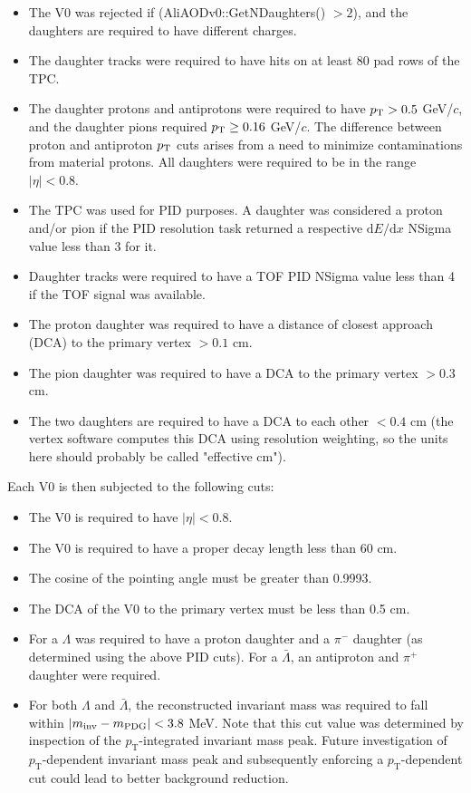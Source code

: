 \begin{itemize}
\item The V0 was rejected if (AliAODv0::GetNDaughters() $> 2$), and the daughters are required to have different charges.
\item The daughter tracks were required to have hits on at least 80 pad rows of the TPC.
\item The daughter protons and antiprotons were required to have $p_{\rm T} > 0.5$ GeV/$c$, and the daughter pions required $p_{\rm T} \geq 0.16$ GeV/$c$. 
The difference between proton and antiproton $p_{\rm T}$ cuts arises from a need to minimize contaminations from material protons. 
All daughters were required to be in the range $|\eta| < 0.8$.
\item The TPC was used for PID purposes.  
A daughter was considered a proton and/or pion if the PID resolution task returned a respective $\mathrm{d}E/\mathrm{d}x$ NSigma value less than 3 for it.
\item Daughter tracks were required to have a TOF PID NSigma value less than 4 if the TOF signal was available.
\item The proton daughter was required to have a distance of closest approach (DCA) to the primary vertex $> 0.1$ cm.
\item The pion daughter was required to have a DCA to the primary vertex $> 0.3$ cm.
\item The two daughters are required to have a DCA to each other $< 0.4$ cm (the vertex software computes this DCA using resolution weighting, so the units here should probably be called "effective cm").

\end{itemize}

Each V0 is then subjected to the following cuts:
\begin{itemize}
\item The V0 is required to have $|\eta| < 0.8$.
\item The V0 is required to have a proper decay length less than 60 cm.
\item The cosine of the pointing angle must be greater than 0.9993.
\item The DCA of the V0 to the primary vertex must be less than 0.5 cm.
\item For a $\Lambda$ was required to have a proton daughter and a $\pi^-$ daughter (as determined using the above PID cuts).  
For a $\bar{\Lambda}$, an antiproton and $\pi^+$ daughter were required.
\item For both $\Lambda$ and $\bar{\Lambda}$, the reconstructed invariant mass was required to fall within $\left\lvert m_\mathrm{inv}-m_\mathrm{PDG}\right\rvert < 3.8$ MeV.  
Note that this cut value was determined by inspection of the $p_\mathrm{T}$-integrated invariant mass peak.  
Future investigation of $p_\mathrm{T}$-dependent invariant mass peak and subsequently enforcing a $p_\mathrm{T}$-dependent cut could lead to better background reduction.  
\end{itemize}

